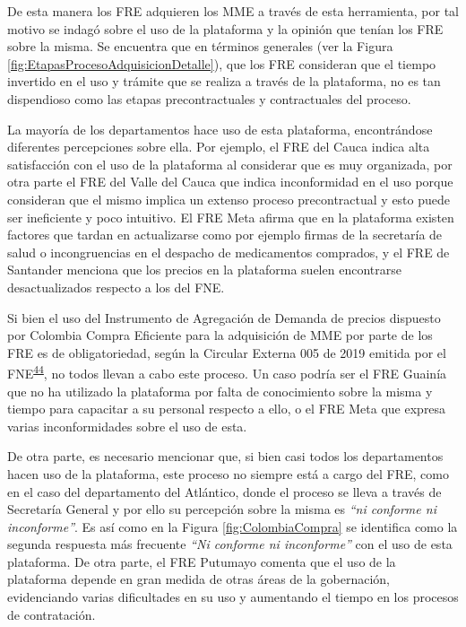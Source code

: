 \documentclass[
]{book}
\begin{document}
De esta manera los FRE adquieren los MME a través de esta herramienta, por tal motivo se indagó sobre el uso de la plataforma y la opinión que tenían los FRE sobre la misma. Se encuentra que en términos generales (ver la Figura \ref{fig:EtapasProcesoAdquisicionDetalle}), que los FRE consideran que el tiempo invertido en el uso y trámite que se realiza a través de la plataforma, no es tan dispendioso como las etapas precontractuales y contractuales del proceso.

La mayoría de los departamentos hace uso de esta plataforma, encontrándose diferentes percepciones sobre ella. Por ejemplo, el FRE del Cauca indica alta satisfacción con el uso de la plataforma al considerar que es muy organizada, por otra parte el FRE del Valle del Cauca que indica inconformidad en el uso porque consideran que el mismo implica un extenso proceso precontractual y esto puede ser ineficiente y poco intuitivo. El FRE Meta afirma que en la plataforma existen factores que tardan en actualizarse como por ejemplo firmas de la secretaría de salud o incongruencias en el despacho de medicamentos comprados, y el FRE de Santander menciona que los precios en la plataforma suelen encontrarse desactualizados respecto a los del FNE.

Si bien el uso del Instrumento de Agregación de Demanda de precios dispuesto por Colombia Compra Eficiente para la adquisición de MME por parte de los FRE es de obligatoriedad, según la Circular Externa 005 de 2019 emitida por el FNE\textsuperscript{\protect\hyperlink{ref-FNE005-2019}{44}}, no todos llevan a cabo este proceso. Un caso podría ser el FRE Guainía que no ha utilizado la plataforma por falta de conocimiento sobre la misma y tiempo para capacitar a su personal respecto a ello, o el FRE Meta que expresa varias inconformidades sobre el uso de esta.

De otra parte, es necesario mencionar que, si bien casi todos los departamentos hacen uso de la plataforma, este proceso no siempre está a cargo del FRE, como en el caso del departamento del Atlántico, donde el proceso se lleva a través de Secretaría General y por ello su percepción sobre la misma es \emph{``ni conforme ni inconforme''}. Es así como en la Figura \ref{fig:ColombiaCompra} se identifica como la segunda respuesta más frecuente \emph{``Ni conforme ni inconforme''} con el uso de esta plataforma. De otra parte, el FRE Putumayo comenta que el uso de la plataforma depende en gran medida de otras áreas de la gobernación, evidenciando varias dificultades en su uso y aumentando el tiempo en los procesos de contratación.
\end{document}
